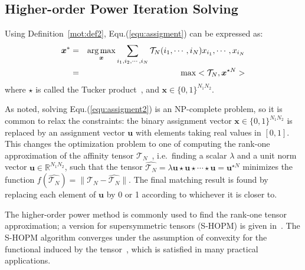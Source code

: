 \subsection{Higher-order Power Iteration Solving}
\label{subsec:oursymmhopm}

Using Definition~\ref{mot:def2}, Equ.(\ref{equ:assigment}) can be expressed as:
\begin{eqnarray}
\label{equ:assigment2}
{\boldsymbol{x}}^* &=& \operatorname*{arg\,max}_{\boldsymbol{x}} \sum_{i_1,i_2,\cdots,i_N} \mathcal{T}_N(i_1,\cdots,i_N) x_{i_1},\cdots,x_{i_N} \nonumber\\
&=& \max <\mathcal{T}_N, \boldsymbol{x}^{\star N}>
\end{eqnarray}
where $\star$ is called the Tucker product~\cite{Kofidis02}, and $\boldsymbol{x} \in \{0,1\}^{N_1N_2}$.

As noted, solving Equ.(\ref{equ:assigment2}) is an NP-complete problem,
so it is common to relax the constraints:
the binary assignment vector $\boldsymbol{x}\in \{0,1\}^{N_1N_2}$ is replaced by an assignment vector $\boldsymbol{u}$ with elements taking real values in $[0,1]$.
This changes the optimization problem to one of computing the rank-one approximation of the affinity tensor $\mathcal{T}_N$~\cite{Lathauwer00},
i.e.\ finding a scalar $\lambda$ and a unit norm vector $\boldsymbol{u}\in \mathbb{R}^{N_1N_2}$,
such that the tensor $\hat{\mathcal{T}_N} = \lambda \boldsymbol{u}\star \boldsymbol{u} \star\cdots \star \boldsymbol{u}=\boldsymbol{u}^{\star N}$ minimizes the function $f(\hat{\mathcal{T}_N})=\lVert \mathcal{T}_N-\hat{\mathcal{T}_N} \lVert$.
The final matching result is found by replacing each element of $\boldsymbol{u}$ by 0 or 1 according to whichever it is closer to.

The higher-order power method is commonly used to find the rank-one tensor approximation;
a version for supersymmetric tensors (S-HOPM) is given in~\cite{Kofidis02}.
The S-HOPM algorithm converges under the assumption of convexity for the functional induced by the tensor~\cite{Kofidis02},
which is satisfied in many practical applications.

